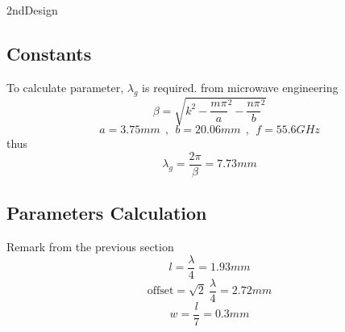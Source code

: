 \documentclass{article}
\begin{document}
\newpage
\begin{homeworkProblem}{2nd}{Design}
\vspace{-1.5em}
\addtocounter{section}{1}
\setcounter{subsection}{0}
\subsection{‫‪Constants}
To calculate parameter, $\lambda_g$ is required. from microwave engineering  
$$\beta = \sqrt{k^2 - \frac{m \pi}{a} ^ 2 - \frac{n \pi}{b} ^ 2}$$ 
$$ a = 3.75 mm ~~ , ~~ b = 20.06 mm  ~~ , ~~ f = 55.6 GHz $$
thus\\
$$ \lambda_g = \frac{2 \pi}{\beta} = 7.73 mm $$
\subsection{Parameters Calculation}
Remark from the previous section 
$$ l = \frac{\lambda}{4} = 1.93 mm $$
$$ \text{offset} = \sqrt{2} ~ \frac{\lambda}{4} = 2.72 mm $$
$$ w = \frac{l}{7} = 0.3 mm $$
\end{homeworkProblem}
\end{document}
